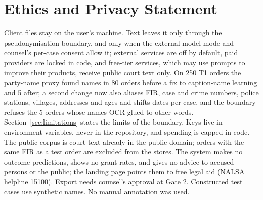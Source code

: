 \section*{Ethics and Privacy Statement}

Client files stay on the user's machine. Text leaves it only through the pseudonymisation boundary, and only when the external-model mode and counsel's per-case consent allow it; external services are off by default, paid providers are locked in code, and free-tier services, which may use prompts to improve their products, receive public court text only. On 250 T1 orders the party-name proxy found names in 80 orders before a fix to caption-name learning and 5 after; a second change now also aliases FIR, case and crime numbers, police stations, villages, addresses and ages and shifts dates per case, and the boundary refuses the 5 orders whose names OCR glued to other words. Section~\ref{sec:limitations} states the limits of the boundary. Keys live in environment variables, never in the repository, and spending is capped in code. The public corpus is court text already in the public domain; orders with the same FIR as a test order are excluded from the stores. The system makes no outcome predictions, shows no grant rates, and gives no advice to accused persons or the public; the landing page points them to free legal aid (NALSA helpline 15100). Export needs counsel's approval at Gate 2. Constructed test cases use synthetic names. No manual annotation was used.
